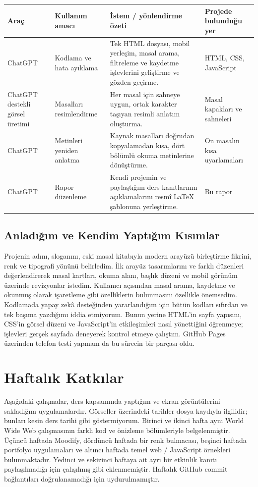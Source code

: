 \documentclass[12pt,a4paper]{article}
\begin{document}
{\small
\begin{longtable}{@{}p{2.3cm}p{3.8cm}p{4.6cm}p{3cm}@{}}
\toprule
\textbf{Araç} & \textbf{Kullanım amacı} & \textbf{İstem / yönlendirme özeti} & \textbf{Projede bulunduğu yer} \\
\midrule
\endhead
ChatGPT & Kodlama ve hata ayıklama & Tek HTML dosyası, mobil yerleşim, masal arama, filtreleme ve kaydetme işlevlerini geliştirme ve gözden geçirme. & HTML, CSS, JavaScript \\
ChatGPT destekli görsel üretimi & Masalları resimlendirme & Her masal için sahneye uygun, ortak karakter taşıyan resimli anlatım oluşturma. & Masal kapakları ve sahneleri \\
ChatGPT & Metinleri yeniden anlatma & Kaynak masalları doğrudan kopyalamadan kısa, dört bölümlü okuma metinlerine dönüştürme. & On masalın kısa uyarlamaları \\
ChatGPT & Rapor düzenleme & Kendi projemin ve paylaştığım ders kanıtlarının açıklamalarını resmî LaTeX şablonuna yerleştirme. & Bu rapor \\
\bottomrule
\end{longtable}}

\subsection{Anladığım ve Kendim Yaptığım Kısımlar}
Projenin adını, sloganını, eski masal kitabıyla modern arayüzü birleştirme fikrini, renk ve tipografi yönünü belirledim. İlk arayüz tasarımlarını ve farklı düzenleri değerlendirerek masal kartları, okuma alanı, başlık düzeni ve mobil görünüm üzerinde revizyonlar istedim. Kullanıcı açısından masal arama, kaydetme ve okunmuş olarak işaretleme gibi özelliklerin bulunmasını özellikle önemsedim. Kodlamada yapay zekâ desteğinden yararlandığım için bütün kodları sıfırdan ve tek başıma yazdığımı iddia etmiyorum. Bunun yerine HTML'in sayfa yapısını, CSS'in görsel düzeni ve JavaScript'in etkileşimleri nasıl yönettiğini öğrenmeye; işlevleri gerçek sayfada deneyerek kontrol etmeye çalıştım. GitHub Pages üzerinden telefon testi yapmam da bu sürecin bir parçası oldu.

\section{Haftalık Katkılar}
Aşağıdaki çalışmalar, ders kapsamında yaptığım ve ekran görüntülerini sakladığım uygulamalardır. Görseller üzerindeki tarihler dosya kaydıyla ilgilidir; bunları kesin ders tarihi gibi göstermiyorum. Birinci ve ikinci hafta aynı World Wide Web çalışmasının farklı kod ve önizleme bölümleriyle belgelenmiştir. Üçüncü haftada Moodify, dördüncü haftada bir renk bulmacası, beşinci haftada portfolyo uygulamaları ve altıncı haftada temel web / JavaScript örnekleri bulunmaktadır. Yedinci ve sekizinci haftaya ait ayrı bir etkinlik kanıtı paylaşılmadığı için çalışılmış gibi eklenmemiştir. Haftalık GitHub commit bağlantıları doğrulanamadığı için uydurulmamıştır.
\end{document}

